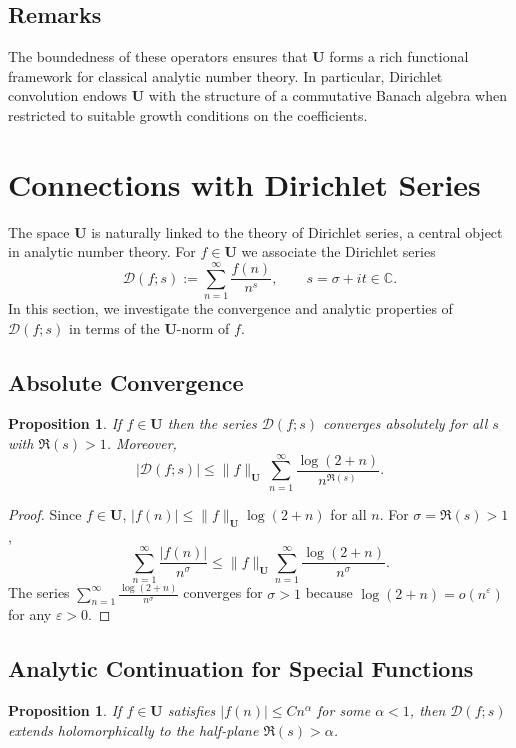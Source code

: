 \documentclass[11pt,a4paper]{article}
\theoremstyle{plain}
\newtheorem{proposition}[theorem]{Proposition}
\theoremstyle{definition}
\theoremstyle{remark}
\begin{document}
\subsection{Remarks}
The boundedness of these operators ensures that
$\mathbf{U}$ forms a rich functional framework for
classical analytic number theory.
In particular, Dirichlet convolution endows
$\mathbf{U}$ with the structure of a commutative
Banach algebra when restricted to suitable
growth conditions on the coefficients.

\section{Connections with Dirichlet Series}

The space $\mathbf{U}$ is naturally linked to the theory of
Dirichlet series, a central object in analytic number theory.
For $f\in\mathbf{U}$ we associate the Dirichlet series
\[
\mathcal{D}(f;s)
:= \sum_{n=1}^{\infty} \frac{f(n)}{n^s},
\qquad s=\sigma+it \in \mathbb{C}.
\]
In this section, we investigate the convergence
and analytic properties of $\mathcal{D}(f;s)$
in terms of the $\mathbf{U}$-norm of $f$.

\subsection{Absolute Convergence}
\begin{proposition}
	If $f\in \mathbf{U}$ then the series
	$\mathcal{D}(f;s)$ converges absolutely
	for all $s$ with $\Re(s)>1$.
	Moreover,
	\[
	\left| \mathcal{D}(f;s) \right|
	\le \|f\|_{\mathbf{U}} \,
	\sum_{n=1}^{\infty}
	\frac{\log(2+n)}{n^{\Re(s)}}.
	\]
\end{proposition}

\begin{proof}
	Since $f\in \mathbf{U}$,
	$|f(n)| \le \|f\|_{\mathbf{U}}\log(2+n)$ for all $n$.
	For $\sigma=\Re(s)>1$,
	\[
	\sum_{n=1}^{\infty}
	\frac{|f(n)|}{n^\sigma}
	\le \|f\|_{\mathbf{U}}
	\sum_{n=1}^{\infty}
	\frac{\log(2+n)}{n^\sigma}.
	\]
	The series $\sum_{n=1}^{\infty}
	\frac{\log(2+n)}{n^\sigma}$ converges for $\sigma>1$
	because $\log(2+n)=o(n^\varepsilon)$ for any $\varepsilon>0$.
\end{proof}

\subsection{Analytic Continuation for Special Functions}
\begin{proposition}
	If $f\in\mathbf{U}$ satisfies
	$|f(n)|\le C n^\alpha$ for some $\alpha<1$,
	then $\mathcal{D}(f;s)$ extends holomorphically
	to the half-plane $\Re(s)>\alpha$.
\end{proposition}
\end{document}
